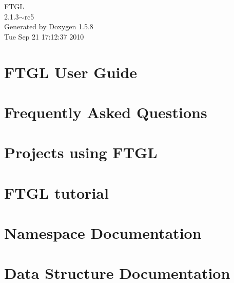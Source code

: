 \documentclass[a4paper]{book}
\begin{document}
\begin{titlepage}
\vspace*{7cm}
\begin{center}
{\Large FTGL \\[1ex]\large 2.1.3$\sim$rc5 }\\
\vspace*{1cm}
{\large Generated by Doxygen 1.5.8}\\
\vspace*{0.5cm}
{\small Tue Sep 21 17:12:37 2010}\\
\end{center}
\end{titlepage}
\clearemptydoublepage
{}
\tableofcontents
\clearemptydoublepage
{}
\chapter{FTGL User Guide}
\label{index}
\chapter{Frequently Asked Questions}
\label{ftgl-faq}

\chapter{Projects using FTGL}
\label{ftgl-projects}

\chapter{FTGL tutorial}
\label{ftgl-tutorial}

\chapter{Namespace Documentation}

\chapter{Data Structure Documentation}





















\end{document}
